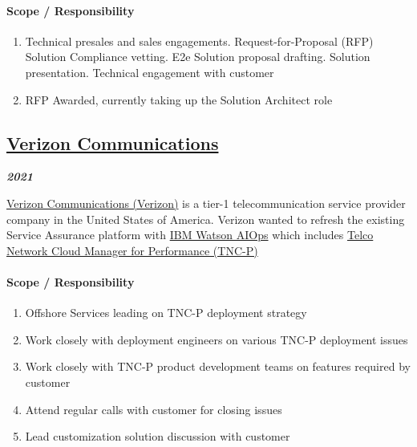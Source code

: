 \documentclass[
]{article}
\providecommand{\tightlist}{%
  \setlength{\itemsep}{0pt}\setlength{\parskip}{0pt}}
\begin{document}
\hypertarget{scope-responsibility}{%
\paragraph{Scope / Responsibility}\label{scope-responsibility}}

\begin{enumerate}
\def\labelenumi{\arabic{enumi}.}
\tightlist
\item
  Technical presales and sales engagements. Request-for-Proposal (RFP)
  Solution Compliance vetting. E2e Solution proposal drafting. Solution
  presentation. Technical engagement with customer
\item
  RFP Awarded, currently taking up the Solution Architect role
\end{enumerate}

\hypertarget{verizon-communications}{%
\subsection{\texorpdfstring{\href{https://www.verizon.com/}{Verizon
Communications}}{Verizon Communications}}\label{verizon-communications}}

\textbf{\emph{2021}}

\href{https://www.verizon.com/}{Verizon Communications (Verizon)} is a
tier-1 telecommunication service provider company in the United States
of America. Verizon wanted to refresh the existing Service Assurance
platform with \href{https://www.ibm.com/watson/aiops-overview/}{IBM
Watson AIOps} which includes
\href{https://www.ibm.com/docs/en/tncm-p/1.4.2}{Telco Network Cloud
Manager for Performance (TNC-P)}

\hypertarget{scope-responsibility-1}{%
\paragraph{Scope / Responsibility}\label{scope-responsibility-1}}

\begin{enumerate}
\def\labelenumi{\arabic{enumi}.}
\tightlist
\item
  Offshore Services leading on TNC-P deployment strategy
\item
  Work closely with deployment engineers on various TNC-P deployment
  issues
\item
  Work closely with TNC-P product development teams on features required
  by customer
\item
  Attend regular calls with customer for closing issues
\item
  Lead customization solution discussion with customer
\end{enumerate}
\end{document}
